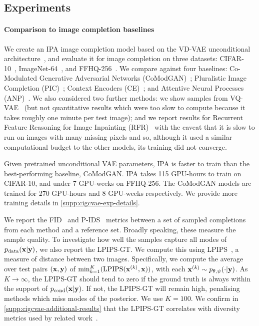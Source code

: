 \subsection{Experiments} \label{sec:cigcvae-experiments}

\paragraph{Comparison to image completion baselines}

We create an IPA image completion model based on the VD-VAE unconditional
architecture~\citep{child2020very}, and evaluate it for image completion on
three datasets: CIFAR-10~\citep{krizhevsky2009learning},
ImageNet-64~\citep{deng2009imagenet}, and FFHQ-256~\citep{karras2019style}. We
compare against four baselines: Co-Modulated Generative Adversarial Networks
(CoModGAN)~\citep{zhao2021large}; Pluralistic Image Completion
(PIC)~\citep{zheng2019pluralistic}; Context Encoders
(CE)~\citep{pathak2016context}; and Attentive Neural Processes
(ANP)~\citep{kim2019attentive}. We also considered two further methods: we show
samples from VQ-VAE~\citep{peng2021generating} (but not quantitative results
which were too slow to compute because it takes roughly one minute per test
image); and we report results for Recurrent Feature Reasoning for Image
Inpainting (RFR)~\citep{li2020recurrent} with the caveat that it is slow to run
on images with many missing pixels and so, although it used a similar
computational budget to the other models, its training did not converge.

Given pretrained unconditional VAE parameters, IPA is faster to train than the
best-performing baseline, CoModGAN. IPA takes 115 GPU-hours to train on
CIFAR-10, and under 7 GPU-weeks on FFHQ-256. The CoModGAN models are trained for
270 GPU-hours and 8 GPU-weeks respectively. We provide more training details in
\cref{supp:cigcvae-exp-details}.

We report the FID~\citep{heusel2017gans} and P-IDS~\citep{zhao2021large} metrics
between a set of sampled completions from each method and a reference set.
Broadly speaking, these measure the sample quality.
%
To investigate how well the samples capture all modes of
$p_{\rm{data}}({\mathbf{x}}|{\mathbf{y}})$, we also report the LPIPS-GT. We compute this using
LPIPS~\citep{zhang2018unreasonable}, a measure of distance between two images.
Specifically, we compute the average over test pairs $({\mathbf{x}}, {\mathbf{y}})$ of
$\min_{k=1}^K(\text{LPIPS}({\mathbf{x}}^{(k)} , {\mathbf{x}}))$, with each ${\mathbf{x}}^{(k)} \sim
p_{\theta,\psi}(\cdot | {\mathbf{y}})$. As $K \rightarrow \infty$, the LPIPS-GT should tend
to zero if the ground truth is always within the support of
$p_{\text{cond}}({\mathbf{x}}|{\mathbf{y}})$. If not, the LPIPS-GT will remain high, penalising
methods which miss modes of the posterior. We use $K=100$. We confirm in
\cref{supp:cigcvae-additional-results} that the LPIPS-GT correlates with diversity
metrics used by related work~\citep{zhu2017toward,li2020multimodal}.


